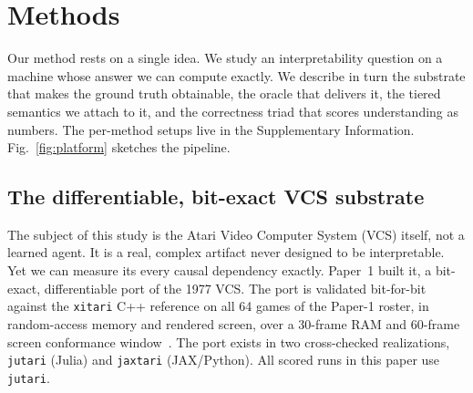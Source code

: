 
\section{Methods}\label{sec:methods}

Our method rests on a single idea. We study an interpretability question on a machine whose
answer we can compute exactly. We describe in turn the substrate that makes the ground truth
obtainable, the oracle that delivers it, the tiered semantics we attach to it, and the
correctness triad that scores understanding as numbers. The per-method
setups live in the Supplementary Information. Fig.~\ref{fig:platform} sketches the pipeline.

\subsection{The differentiable, bit-exact VCS substrate}\label{sec:substrate}

The subject of this study is the Atari Video Computer System (VCS) itself, not a learned
agent. It is a real, complex artifact never designed to be interpretable. Yet we can
measure its every causal dependency exactly. Paper~1 built it, a bit-exact, differentiable
port of the 1977 VCS. The port is validated bit-for-bit against the \texttt{xitari} C++
reference on all 64 games of the Paper-1 roster, in random-access memory and rendered screen,
over a 30-frame RAM and 60-frame screen conformance window~\cite{maier2025vcs,xitari}. The port
exists in two cross-checked realizations, \texttt{jutari} (Julia) and \texttt{jaxtari}
(JAX/Python). All scored runs in this paper use \texttt{jutari}.

